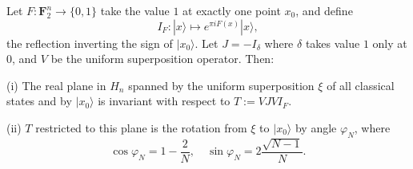 Let $F : \mathbf{F}_2^n \rightarrow \{0,1\}$ take the value $1$ at exactly one point $x_0$, and define
$$I_F : |x\rangle \mapsto e^{\pi i F(x)} |x\rangle,$$
the reflection inverting the sign of $|x_0\rangle$. Let $J = -I_\delta$ where $\delta$ takes value $1$ only at $0$, and $V$ be the uniform superposition operator. Then:

(i) The real plane in $H_n$ spanned by the uniform superposition $\xi$ of all classical states and by $|x_0\rangle$ is invariant with respect to $T := VJVI_F$.

(ii) $T$ restricted to this plane is the rotation from $\xi$ to $|x_0\rangle$ by angle $\varphi_N$, where
$$\cos \varphi_N = 1 - \frac{2}{N}, \quad \sin \varphi_N = 2\frac{\sqrt{N-1}}{N}.$$
